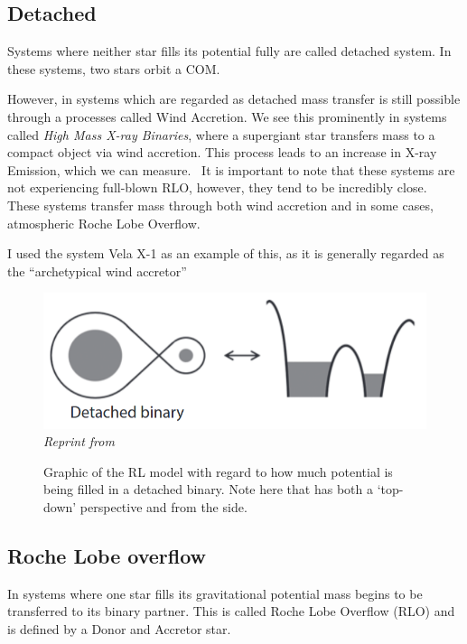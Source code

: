 \documentclass[12pt, letterpaper]{article}
\begin{document}
        \subsection{\centering Detached}

        Systems where neither star fills its potential fully are called detached system. In these systems, two stars orbit a COM.

        However, in systems which are regarded as detached mass transfer is still possible through a processes called Wind Accretion. We see this prominently in systems called \textit{High Mass X-ray Binaries}, where a supergiant star transfers mass to a compact object via wind accretion. This process leads to an increase in X-ray Emission, which we can measure.~\cite{TaurisvandenHeuvel+2023} It is important to note that these systems are not experiencing full-blown RLO, however, they tend to be incredibly close. \cite{TaurisvandenHeuvel+2023} These systems transfer mass through both wind accretion and in some cases, atmospheric Roche Lobe Overflow.

        I used the system Vela X-1 \cite{Kretschmar_2021} as an example of this, as it is generally regarded as the ``archetypical wind accretor''~\cite{Kretschmar_2021} 

        \begin{figure}[h!]
            \centering
            \includegraphics[scale = .4]{Figs/Detached binary.png}\\
            \textit{Reprint from~\cite{TaurisvandenHeuvel+2023}}
            \caption{Graphic of the RL model with regard to how much potential is being filled in a detached binary. Note here that has both a `top-down' perspective and from the side.}
            \label{DetachedBinaryRL}
        \end{figure}
        
        \subsection{\centering Roche Lobe overflow} %
        In systems where one star fills its gravitational potential mass begins to be transferred to its binary partner. This is called Roche Lobe Overflow (RLO) and is defined by a Donor and Accretor star. 
        
\end{document}
